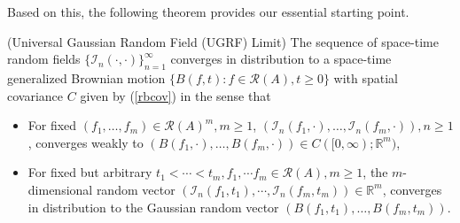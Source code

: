 \documentclass[11pt]{article}
\numberwithin{equation}{section}
\theoremstyle{definition}
\theoremstyle{remark}
\theoremstyle{definition}
\begin{document}
Based on this,  the following  theorem provides
our essential starting point.

\begin{thm}{(Universal Gaussian Random Field (UGRF) Limit)}
\label{spacetimecov}
The sequence of space-time 
random fields $\{\mathcal{I}_n(\cdot,\cdot)\}_{n=1}^\infty$
converges in distribution to a space-time generalized
Brownian motion $\{B(f,t):f\in\mathcal{R}(A),t\ge 0\}$
with spatial covariance $C$ given by (\ref{rbcov})
in the sense that 
\begin{itemize}
\item For fixed $(f_1,\dots,f_m)\in\mathcal{R}(A)^m, m\ge 1$,
$(\mathcal{I}_n(f_1,\cdot),\dots,\mathcal{I}_n(f_m,\cdot)), n\ge 1$, converges weakly to $(B(f_1,\cdot),\dots,B(f_m,\cdot))\in C([0,\infty);\mathbb{R}^m)$,
\item For fixed but arbitrary 
 $t_1<\cdots<t_m, f_1,\cdots f_m\in\mathcal{R}(A), m\ge 1$, the $m$-dimensional random vector
 $(\mathcal{I}_n(f_1,t_1),\cdots,\mathcal{I}_n(f_m,t_m))\in\mathbb{R}^m$, 
converges in distribution to the Gaussian random vector $(B(f_1,t_1),\dots,B(f_m,t_m))$.
\end{itemize}
\end{thm}
\end{document}
